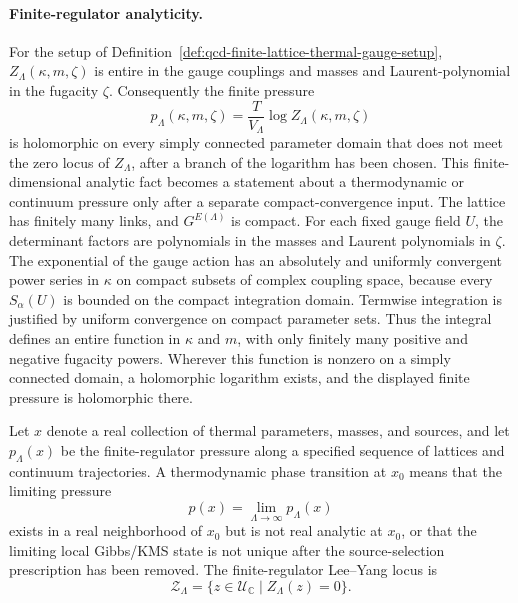\paragraph{Finite-regulator analyticity.}
For the setup of Definition~\ref{def:qcd-finite-lattice-thermal-gauge-setup},
\(Z_\Lambda(\kappa,m,\zeta)\) is entire in the gauge couplings and masses
and Laurent-polynomial in the fugacity \(\zeta\).  Consequently the finite
pressure
\[
  p_\Lambda(\kappa,m,\zeta)
  =
  \frac{T}{V_\Lambda}\log Z_\Lambda(\kappa,m,\zeta)
\]
is holomorphic on every simply connected parameter domain that does not meet
the zero locus of \(Z_\Lambda\), after a branch of the logarithm has been
chosen.  This finite-dimensional analytic fact becomes a statement about a
thermodynamic or continuum pressure only after a separate compact-convergence
input.  The lattice has finitely many links, and \(G^{E(\Lambda)}\) is
compact.  For
each fixed gauge field \(U\), the determinant factors are polynomials in the
masses and Laurent polynomials in \(\zeta\).  The exponential of the gauge
action has an absolutely and uniformly convergent power series in
\(\kappa\) on compact subsets of complex coupling space, because every
\(S_\alpha(U)\) is bounded on the compact integration domain.  Termwise
integration is justified by uniform convergence on compact parameter sets.
Thus the integral defines an entire function in \(\kappa\) and \(m\), with
only finitely many positive and negative fugacity powers.  Wherever this
function is nonzero on a simply connected domain, a holomorphic logarithm
exists, and the displayed finite pressure is holomorphic there.

\begin{definition}
\label{def:qcd-thermodynamic-phase-transition}
Let \(x\) denote a real collection of thermal parameters, masses, and
sources, and let \(p_\Lambda(x)\) be the finite-regulator pressure along a
specified sequence of lattices and continuum trajectories.  A thermodynamic
phase transition at \(x_0\) means that the limiting pressure
\[
  p(x)=\lim_{\Lambda\to\infty}p_\Lambda(x)
\]
exists in a real neighborhood of \(x_0\) but is not real analytic at
\(x_0\), or that the limiting local Gibbs/KMS state is not unique after the
source-selection prescription has been removed.  The finite-regulator
Lee--Yang locus is
\[
  \mathcal Z_\Lambda
  =
  \{z\in\mathcal U_{\mathbb C}\mid Z_\Lambda(z)=0\}.
\]
\end{definition}

